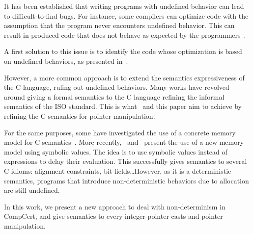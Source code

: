 It has been established that writing programs with undefined behavior can lead to difficult-to-find bugs.
For instance, some compilers can optimize code with the assumption that the program never encounters undefined behavior. This can result in produced code that does not behave as expected by the programmers~\cite{DBLP:conf/apsys/WangCCJZK12}.

A first solution to this issue is to identify the code whose optimization is based on undefined behaviors, as presented in~\cite{DBLP:conf/sosp/WangZKS13}.

However, a more common approach is to extend the semantics expressiveness of the C language, ruling out undefined behaviors.
Many works have revolved around giving a formal semantics to the C language refining the informal semantics of the ISO standard.
This is what~\cite{DBLP:conf/pldi/KangHMGZV15} and this paper aim to achieve by refining the C semantics for pointer manipulation.

For the same purposes, some have investigated the use of a concrete memory model for C semantics~\cite{DBLP:conf/popl/TuchKN07}\cite{Norrish98cformalised}.
More recently,~\cite{besson:hal-01093312} and~\cite{DBLP:conf/itp/BessonBW15} present the use of a new memory model using symbolic values. The idea is to use symbolic values instead of expressions to delay their evaluation. This successfully gives semantics to several C idioms: alignment constraints, bit-fields\dots However, as it is a deterministic semantics, programs that introduce non-deterministic behaviors due to allocation are still undefined.

In this work, we present a new approach to deal with non-determinism in CompCert, and give semantics to every integer-pointer casts and pointer manipulation.

